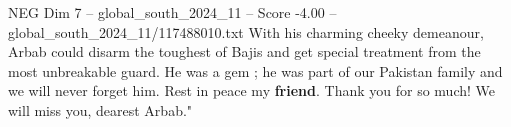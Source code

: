 \begin{textsample}{NEG Dim 7 – global\_south\_2024\_11 – Score -4.00 – global\_south\_2024\_11/117488010.txt}
With his charming cheeky demeanour, Arbab could disarm the toughest of Bajis and get special treatment from the most unbreakable guard.
He was a gem ; he was part of our Pakistan family and we will never forget him.
Rest in peace my \textbf{friend}.
Thank you for so much!
We will miss you, dearest Arbab."

\end{textsample}
